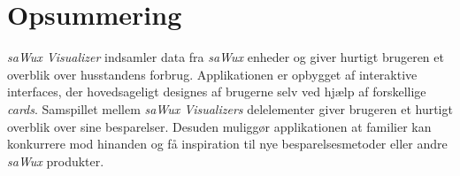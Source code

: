 \section{Opsummering}
\emph{saWux Visualizer} indsamler data fra \emph{saWux} enheder og giver hurtigt brugeren et overblik over husstandens forbrug. Applikationen er opbygget af interaktive interfaces, der hovedsageligt designes af brugerne selv ved hjælp af forskellige \emph{cards}. Samspillet mellem \emph{saWux Visualizers} delelementer giver brugeren et hurtigt overblik over sine besparelser. Desuden muliggør applikationen at familier kan konkurrere mod hinanden og få inspiration til nye besparelsesmetoder eller andre \emph{saWux} produkter. 
